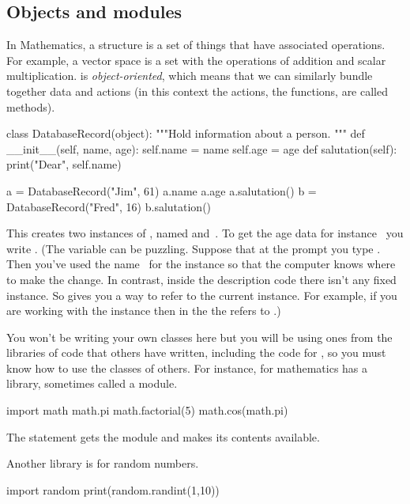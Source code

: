 \subsection{Objects and modules}
In Mathematics, a structure is a set of things that have associated operations.
For example, a vector space is a set with the operations
of addition and scalar multiplication.
\python{} is \textit{object-oriented}, which means that we can similarly bundle
together data and actions (in this context the actions, the functions, 
are called methods).
\begin{pythonconsole}
class DatabaseRecord(object):
    """Hold information about a person.
    """
    def __init__(self, name, age):
        self.name = name
        self.age = age
    def salutation(self):
        print("Dear", self.name)

a = DatabaseRecord("Jim", 61)
a.name
a.age
a.salutation()
b = DatabaseRecord("Fred", 16)
b.salutation()
\end{pythonconsole}
\noindent
This creates two instances of 
, named  and~.
To get the age data for instance~
you write 
.
(The \protect{} variable 
can  be puzzling.
Suppose that at the prompt you type .
Then you've used the name~ 
for the instance so that the computer knows where to
make the change.
In contrast,
inside the  description code there isn't any fixed instance. 
So  gives you a way to refer to the current instance. 
For example, if you are working with the instance  then 
in the  the  refers
to .)

You won't be writing your own classes here 
but you will be using ones from
the libraries of code that others have written, including the
code for \Sage, so you must know how to use the classes of others. 
For instance, for mathematics \python{} has a library, 
sometimes called a module.
\begin{pythonconsole}
import math
math.pi
math.factorial(5)
math.cos(math.pi)
\end{pythonconsole}
\noindent
The  statement gets the module and makes
its contents available.

Another library is for random numbers.
\begin{pythonconsole}
import random
print(random.randint(1,10))

\end{pythonconsole}



